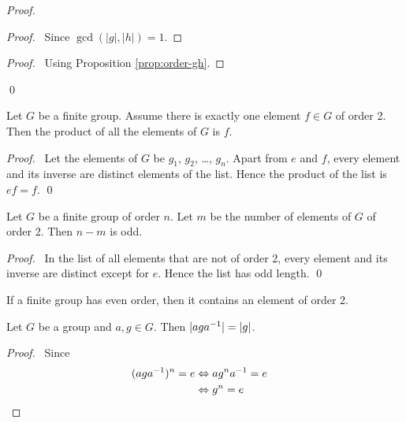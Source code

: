 \begin{proof}
    \pf
    \begin{proof}
        \pf\ Since $\gcd(|g|,|h|) = 1$.
    \end{proof}
    \begin{proof}
        \pf\ Using Proposition \ref{prop:order-gh}.
    \end{proof}
    \qed
\end{proof}

\begin{prop}
    \label{prop:product-of-all-elements}
    Let $G$ be a finite group. Assume there is exactly one element $f \in G$ of order 2. Then the product of all the elements of $G$ is $f$.
\end{prop}

\begin{proof}
    \pf\ Let the elements of $G$ be $g_1$, $g_2$, \ldots, $g_n$. Apart from $e$ and $f$, every element and its inverse are distinct elements of the list. Hence the product of the list is $ef = f$. \qed
\end{proof}

\begin{prop}
    Let $G$ be a finite group of order $n$. Let $m$ be the number of elements of $G$ of order 2. Then $n-m$ is odd.
\end{prop}

\begin{proof}
    \pf\ In the list of all elements that are not of order 2, every element and its inverse are distinct except for $e$. Hence the list has odd length. \qed
\end{proof}

\begin{cor}
    If a finite group has even order, then it contains an element of order 2.
\end{cor}

\begin{prop}
    Let $G$ be a group and $a,g \in G$. Then $|ag{a}^{-1}| = |g|$.
\end{prop}

\begin{proof}
    \pf\ Since
    \begin{align*}
        (ag{a}^{-1})^n = e & \Leftrightarrow a g^n {a}^{-1} = e        \\
                          & \Leftrightarrow g^n = e           & \relax
    \end{align*}
\end{proof}

